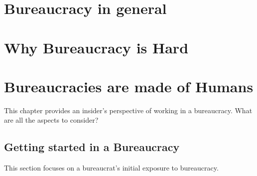 \documentclass{book}
\begin{document}
  \clearpage
    
    
    
     
  \clearpage
  \clearpage %

\chapter{Bureaucracy in general\label{sec:bureaucracy-in-general}}
   
  \clearpage
   
  \clearpage
  
  
  \clearpage
   
  \clearpage
  
  \clearpage
   
  \clearpage

\chapter{Why Bureaucracy is Hard}
  \clearpage
  \clearpage
  \clearpage


\chapter{Bureaucracies are made of Humans\label{b_made_of_humans}}

This chapter provides an insider's perspective of working in a bureaucracy. What are all the aspects to consider?

  \section{Getting started in a Bureaucracy}
    This section focuses on a bureaucrat's initial exposure to bureaucracy. 
  
    
    
    
    
    
    
    
    
    
    
  \clearpage
\end{document}
